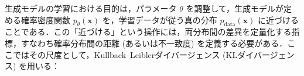 \documentclass[titlepage]{ltjsbook}
\begin{document}
\begin{comment}
事後分布 $p(\theta \mid \mathcal{D})$ は、観測データを得た後のパラメータ $\theta$ の確率分布であり、ベイズ推論はこの分布を更新する過程とみなせる。十分に更新された事後分布が得られれば、新たなデータの予測も可能となる。予測においては事後分布全体を平均化した事後予測分布 (posterior predictive distribution) を用いる. 予測対象のデータを $\tilde{x}$ とすると, 
\begin{align}
p^*(\tilde{x}) := p(\tilde{x} \mid \mathcal{D})
&= \int p(\tilde{x} \mid \theta, \mathcal{D}) \, p(\theta \mid \mathcal{D}) \, \mathrm{d}\theta \\
&= \int p(\tilde{x} \mid \theta) \, p(\theta \mid \mathcal{D}) \, \mathrm{d}\theta
\quad (\because \tilde{x} \perp\!\!\!\perp \mathcal{D} \mid \theta)
\end{align}
となる. ここで最後の等式は, 「$\theta$ が与えられた条件下で $\tilde{x}$ と $\mathcal{D}$ が独立」という条件付き独立性を用いたものである. ベイズ推論において, この事後予測分布 $p^*(\tilde{x})$ が真の生成分布の推定結果となる. 




\section{生成モデル}
生成モデルとは，学習データに内在する特徴や構造を学習し，それに基づいて新たなデータを生成するモデルである．ここで，学習対象となる観測データ (例えば感覚入力) を $\mathbf{x} \in \mathbb{R}^d$ とし，それらが従う真の確率密度関数を $p_{\mathrm{data}}(\cdot)$ と表す．この密度関数 $p_{\mathrm{data}}(\cdot)$ は，実世界においてデータがどのように生成されるかを記述するものであり，$\mathbf{x}$ における確率密度は $p_{\mathrm{data}}(\mathbf{x})$ で与えられる．このような密度関数 $p_{\mathrm{data}}(\cdot)$ が既知であれば，任意のサンプル $\mathbf{x}$ をそこから生成 (サンプリング) することができる．しかし現実には，$p_{\mathrm{data}}(\cdot)$ は明示的な形では与えられておらず，ほとんどの場合において未知である．観測データがある確率的な生成過程に従って生じたと仮定し，その過程を表現するために，パラメータ $\theta$ をもつ確率密度関数 $p_\theta(\mathbf{x})$ を導入する．ここで，$p_\theta(\mathbf{x})$ は，観測変数 $\mathbf{x}$ に対する条件付き分布 $p(\mathbf{x} \mid \theta)$ の略記である．このような分布 $p_\theta(\mathbf{x})$ を定めるモデルを，生成モデル (generative model) と呼ぶ．
\end{comment}
生成モデルの学習における目的は，パラメータ $\theta$ を調整して，生成モデルが定める確率密度関数 $p_\theta(\mathbf{x})$ を，学習データが従う真の分布 $p_{\mathrm{data}}(\mathbf{x})$ に近づけることである．この「近づける」という操作には，両分布間の差異を定量化する指標，すなわち確率分布間の距離 (あるいは不一致度) を定義する必要がある．ここではその尺度として，Kullback–Leiblerダイバージェンス (KLダイバージェンス) を用いる：
\end{document}
